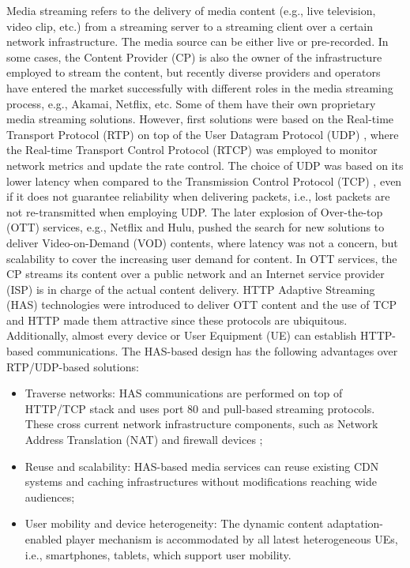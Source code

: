 Media streaming refers to the delivery of media content (e.g., live television, video clip, etc.) from a streaming server to a streaming client over a certain network infrastructure. The media source can be either live or pre-recorded. In some cases, the Content Provider (CP) is also the owner of the infrastructure employed to stream the content, but recently diverse providers and operators have entered the market successfully with different roles in the media streaming process, e.g., Akamai, Netflix, etc. Some of them have their own proprietary media streaming solutions. However, first solutions were based on the Real-time Transport Protocol (RTP) \cite{schulzrinne1996rtp} on top of the User Datagram Protocol (UDP) \cite{postel1980user}, where the Real-time Transport Control Protocol (RTCP) \cite{schulzrinne1996rtp} was employed to monitor network metrics and update the rate control. The choice of UDP was based on its lower latency when compared to the Transmission Control Protocol (TCP) \cite{postel1981transmission}, even if it does not guarantee reliability when delivering packets, i.e., lost packets are not re-transmitted when employing UDP. The later explosion of Over-the-top (OTT) services, e.g., Netflix and Hulu, pushed the search for new solutions to deliver Video-on-Demand (VOD) contents, where latency was not a concern, but  scalability to cover the increasing user demand for content. In OTT services, the CP streams its content over a public network and an Internet service provider (ISP) is in charge of the actual content delivery. HTTP Adaptive Streaming (HAS) \cite{Seufert2014} technologies were introduced to deliver OTT content and the use of TCP and HTTP made them attractive since these protocols are ubiquitous. Additionally, almost every device or User Equipment (UE) can establish HTTP-based communications. The HAS-based design has the following advantages over RTP/UDP-based solutions:

\begin{itemize}
	\item Traverse networks: HAS communications are performed on top of HTTP/TCP stack and uses port 80 and \hbox{pull-based} streaming protocols. These cross current network infrastructure components, such as Network Address Translation (NAT) and firewall devices \cite{Popa2010};
	\item Reuse and scalability: HAS-based media services can reuse existing CDN systems and caching infrastructures without modifications reaching wide audiences;
	\item User mobility and device heterogeneity: The dynamic content adaptation-enabled player mechanism is accommodated by all latest heterogeneous UEs, i.e., smartphones, tablets, which support user mobility.
\end{itemize}

